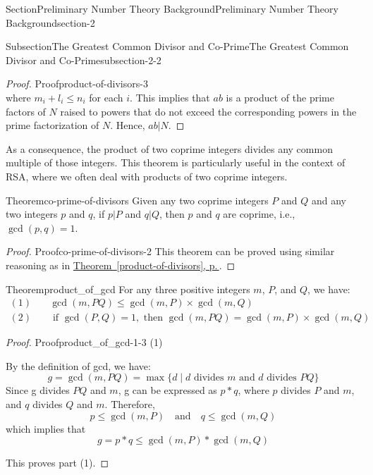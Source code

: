 \documentclass[oneside,12pt,]{article}
\newcommand{\xreffont}{\relax}
\numberwithin{equation}{section}
\begin{document}
\begin{sectionptx}{Section}{Preliminary Number Theory Background}{}{Preliminary Number Theory Background}{}{}{section-2}
\begin{subsectionptx}{Subsection}{The Greatest Common Divisor and Co-Prime}{}{The Greatest Common Divisor and Co-Prime}{}{}{subsection-2-2}
\begin{proof}{Proof}{}{product-of-divisors-3}
\begin{equation*}
\end{equation*}
where \(m_i + l_i \leq n_i\) for each \(i\). This implies that \(ab\) is a product of the prime factors of \(N\) raised to powers that do not exceed the corresponding powers in the prime factorization of \(N\). Hence, \(ab|N\).%
\end{proof}
As a consequence, the product of two coprime integers divides any common multiple of those integers. This theorem is particularly useful in the context of RSA, where we often deal with products of two coprime integers.%
\begin{theorem}{Theorem}{}{}{co-prime-of-divisors}%
Given any two coprime integers \(P\) and \(Q\) and any two integers \(p\) and \(q\), if \(p|P\) and \(q|Q\), then \(p\) and \(q\) are coprime, i.e., \(\gcd(p, q) = 1\).%
\end{theorem}
\begin{proof}{Proof}{}{co-prime-of-divisors-2}
This theorem can be proved using similar reasoning as in \hyperref[product-of-divisors]{Theorem~{\xreffont\ref{product-of-divisors}}, p.\,\pageref{product-of-divisors}}.%
\end{proof}
\begin{theorem}{Theorem}{}{}{product_of_gcd}%
For any three positive integers \(m\), \(P\), and \(Q\), we have:%
%
\begin{align*}
(1) \quad & \gcd(m, PQ) \leq \gcd(m, P) \times \gcd(m, Q)\\
(2) \quad & \text{ if } \gcd(P, Q) = 1, \text{ then } \gcd(m, PQ) = \gcd(m, P) \times \gcd(m, Q)
\end{align*}
\begin{proof}{Proof}{}{product_of_gcd-1-3}
(1)%
\par
By the definition of gcd, we have:%
\begin{equation*}
g = \gcd(m, PQ) = \max\{d \mid d \text{ divides } m \text{ and } d \text{ divides } PQ\}
\end{equation*}
Since g divides \(PQ\) and \(m\), g can be expressed as \(p * q\), where \(p\) divides \(P\) and \(m\), and \(q\) divides \(Q\) and \(m\). Therefore,%
\begin{equation*}
p \leq \gcd(m, P) \quad \text{and} \quad q \leq \gcd(m, Q)
\end{equation*}
which implies that%
\begin{equation*}
g = p * q \leq \gcd(m, P) * \gcd(m, Q)
\end{equation*}
%
\par
This proves part (1).%
\par

\end{proof}
\end{theorem}
\end{subsectionptx}
\end{sectionptx}
\end{document}
